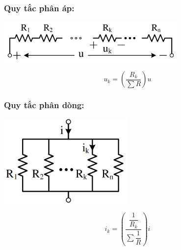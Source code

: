 \subsubsection{Quy tắc phân áp:}
\begin{center}
  \includegraphics[width = 0.7\textwidth]{./image/27.png}
\end{center}
\begin{equation}
  u_k = \left( \frac{R_k}{\sum R} \right)u
\end{equation}
\subsubsection{Quy tắc phân dòng:}
\begin{center}
  \includegraphics[width = 0.5\textwidth]{./image/28.png}
\end{center}
\begin{equation}
  i_k = \left( \frac{\dfrac{1}{R_k}}{\sum \dfrac{1}{R}} \right)i
\end{equation}